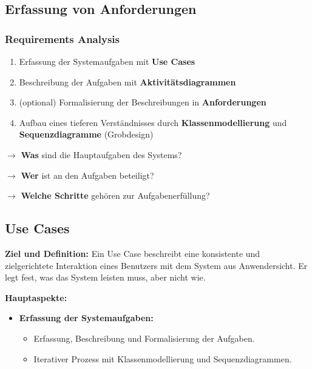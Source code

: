 \documentclass[11pt, a4paper]{article}
\begin{document}
\subsection{Erfassung von Anforderungen}

\subsubsection{Requirements Analysis}

\begin{enumerate}
    \item Erfassung der Systemaufgaben mit \textbf{Use Cases}
    \item Beschreibung der Aufgaben mit \textbf{Aktivitätsdiagrammen}
    \item (optional) Formalisierung der Beschreibungen in \textbf{Anforderungen}
    \item Aufbau eines tieferen Verständnisses durch \textbf{Klassenmodellierung} und \textbf{Sequenzdiagramme} (Grobdesign)
\end{enumerate}

\vspace{1em}

$ \rightarrow $ \textbf{Was} sind die Hauptaufgaben des Systems?

$ \rightarrow $ \textbf{Wer} ist an den Aufgaben beteiligt?

$ \rightarrow $ \textbf{Welche Schritte} gehören zur Aufgabenerfüllung?

\newpage

\subsection{Use Cases}


\noindent\textbf{Ziel und Definition:} Ein Use Case beschreibt eine konsistente und zielgerichtete Interaktion eines Benutzers mit dem System aus Anwendersicht. Er legt fest, was das System leisten muss, aber nicht wie.

\noindent\textbf{Hauptaspekte:}
\begin{itemize}
    \item \textbf{Erfassung der Systemaufgaben:} 
    \begin{itemize}
        \item Erfassung, Beschreibung und Formalisierung der Aufgaben.
        \item Iterativer Prozess mit Klassenmodellierung und Sequenzdiagrammen.
    \end{itemize}
\end{itemize}
\end{document}
